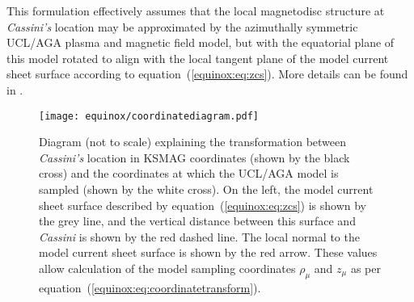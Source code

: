 This formulation effectively assumes that the local magnetodisc structure at \textit{Cassini's} location may be approximated by the azimuthally symmetric UCL/AGA plasma and magnetic field model, but with the equatorial plane of this model rotated to align with the local tangent plane of the model current sheet surface according to equation~(\ref{equinox:eq:zcs}). More details can be found in {\citet{achilleos2014}}. 
\begin{figure}
\centering
\texttt{[image: equinox/coordinatediagram.pdf]}
\caption[Diagram illustrating the transformation between \textit{Cassini} location and UCL/AGA model sampling coordinates.]{Diagram (not to scale) explaining the transformation between \textit{Cassini's} location in KSMAG coordinates (shown by the black cross) and the coordinates at which the UCL/AGA model is sampled (shown by the white cross). On the left, the model current sheet surface described by equation~(\ref{equinox:eq:zcs}) is shown by the grey line, and the vertical distance between this surface and \textit{Cassini} is shown by the red dashed line. The local normal to the model current sheet surface is shown by the red arrow. These values allow calculation of the model sampling coordinates $\rho_\mu$ and $z_\mu$ as per equation~(\ref{equinox:eq:coordinatetransform}).}
\label{equinox:fig:transformdiagram}
\end{figure}

